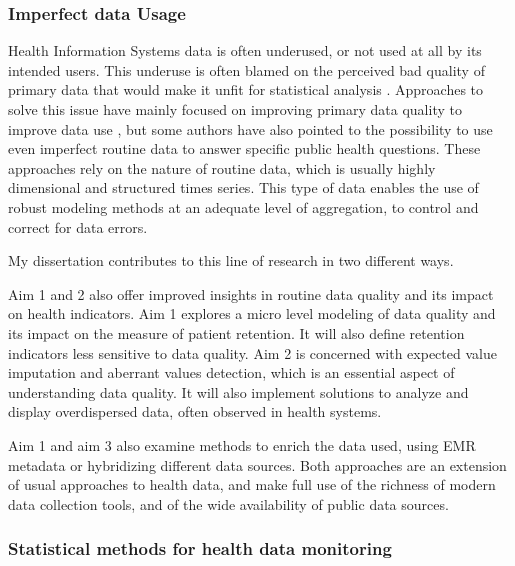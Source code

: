\subsubsection{Imperfect data Usage}


Health Information Systems data is often underused, or not used at all by its intended users\cite{health_metrics_network_framework_2008}. This underuse is often blamed on the  perceived bad quality of primary data that would make it unfit for statistical analysis
\cite{ronveaux_immunization_2005,makombe_assessing_2008,heunis_accuracy_2011,gimbel_assessment_2011,who_assessment_2011,hahn_where_2013,kihuba_assessing_2014,glele_ahanhanzo_data_2015}. Approaches to solve this issue have mainly focused on improving primary data quality to improve data use  \cite{braa_improving_2012,mutale_improving_2013,ledikwe_improving_2014,nisingizwe_toward_2014}, but some authors have also pointed to the possibility to use even imperfect routine data to answer specific public health questions\cite{gething_improving_2006,gething_information_2007,wagenaar_using_2016}. These approaches rely on the nature of routine data, which is usually highly dimensional and structured times series. This type of data enables the use of robust modeling methods at an adequate level of aggregation, to control and correct for data errors.

My dissertation contributes to this line of research in two different ways.

Aim 1 and 2 also offer improved insights in routine data quality and its impact on health indicators. Aim 1  explores a micro level modeling of data quality and its impact on the measure of patient retention. It will also define retention indicators less sensitive to data quality. Aim 2 is concerned with expected value imputation and aberrant values detection, which is an essential aspect of understanding data quality. It will also implement solutions  to analyze and display overdispersed data, often observed in health systems.

Aim 1 and aim 3 also examine methods to enrich the data used, using EMR metadata or  hybridizing different data sources. Both approaches are an extension of usual approaches to health data, and make full use of the richness of modern data collection tools, and of the wide availability of public data sources.

\subsubsection{Statistical methods for health data monitoring}

